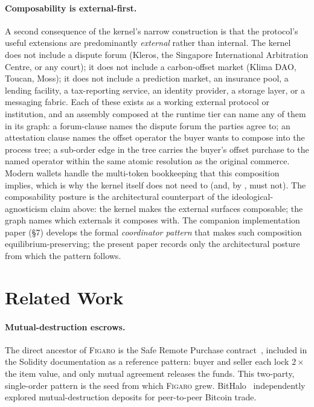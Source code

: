 \documentclass[11pt,a4paper]{article}
\theoremstyle{definition}
\theoremstyle{remark}
\newcommand{\figaro}{\textsc{Figaro}}
\begin{document}
\paragraph{Composability is external-first.} A second consequence
of the kernel's narrow construction is that the protocol's useful
extensions are predominantly \emph{external} rather than internal.
The kernel does not include a dispute forum (Kleros, the Singapore
International Arbitration Centre, or any court); it does not
include a carbon-offset market (Klima DAO, Toucan, Moss); it does
not include a prediction market, an insurance pool, a lending
facility, a tax-reporting service, an identity provider, a storage
layer, or a messaging fabric. Each of these exists as a working
external protocol or institution, and an assembly composed at the
runtime tier can name any of them in its graph: a forum-clause
names the dispute forum the parties agree to; an attestation
clause names the offset operator the buyer wants to compose into
the process tree; a sub-order edge in the tree carries the
buyer's offset purchase to the named operator within the same
atomic resolution as the original commerce. Modern wallets handle
the multi-token bookkeeping that this composition implies, which
is why the kernel itself does not need to (and, by
, must not). The composability
posture is the architectural counterpart of the
ideological-agnosticism claim above: the kernel makes the external
surfaces composable; the graph names which externals it composes
with. The companion implementation
paper (§7) develops the formal
\emph{coordinator pattern} that makes such composition
equilibrium-preserving; the present paper records only the
architectural posture from which the pattern follows.

\section{Related Work}
\label{sec:related}

\paragraph{Mutual-destruction escrows.}
The direct ancestor of \figaro{} is the Safe Remote Purchase
contract~\citep{buterin2016}, included in the Solidity documentation
as a reference pattern: buyer and seller each lock $2\times$ the item
value, and only mutual agreement releases the funds. This two-party,
single-order pattern is the seed from which \figaro{} grew.
BitHalo~\citep{bithalo2014} independently explored mutual-destruction
deposits for peer-to-peer Bitcoin trade.
\end{document}
